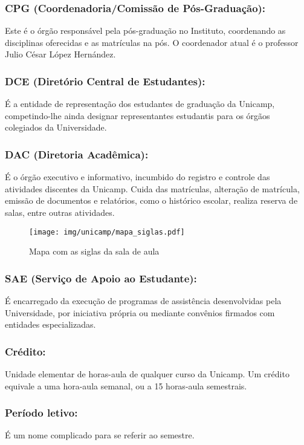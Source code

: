 \subsubsection{CPG (Coordenadoria/Comissão de Pós-Graduação):} Este é o órgão
responsável pela pós-graduação no Instituto, coordenando as disciplinas
oferecidas e as matrículas na pós. O coordenador atual é o professor Julio 
César López Hernández.

\subsubsection{DCE (Diretório Central de Estudantes):} É a entidade de
representação dos estudantes de graduação da Unicamp, competindo-lhe ainda
designar representantes estudantis para os órgãos colegiados da Universidade.

\subsubsection{DAC (Diretoria Acadêmica):} É o órgão executivo e informativo,
incumbido do registro e controle das atividades discentes da Unicamp. Cuida das
matrículas, alteração de matrícula, emissão de documentos e relatórios, como o
histórico escolar, realiza reserva de salas, entre outras atividades.

\begin{figure*}[hb!]  \centering
  \texttt{[image: img/unicamp/mapa\_siglas.pdf]}
  \caption{Mapa com as siglas da sala de aula}
  \label{fig:mapa_siglas}
\end{figure*}

\subsubsection{SAE (Serviço de Apoio ao Estudante):} É encarregado da execução
de programas de assistência desenvolvidas pela Universidade, por iniciativa
própria ou mediante convênios firmados com entidades especializadas.

\subsubsection{Crédito:} Unidade elementar de horas-aula de qualquer curso da
Unicamp. Um crédito equivale a uma hora-aula semanal, ou a 15 horas-aula
semestrais.

\subsubsection{Período letivo:} É um nome complicado para se referir ao
semestre.

